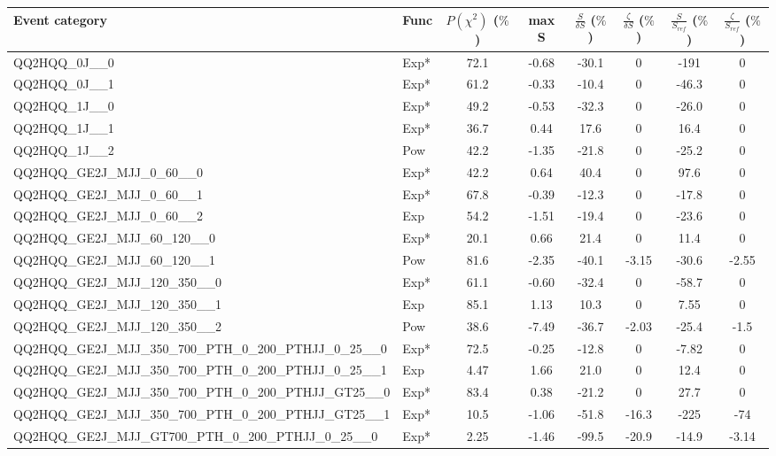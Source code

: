 \begin{table}[!h]
   \centering  \scriptsize
    \begin{tabular}{llcccccc}
    \hline
    \hline
   Event category               & Func &  $P(\chi^2)$ ($\%$) & max S  & $\frac{S}{\delta S}$ ($\%$)  &  $\frac{\zeta}{\delta S}$ ($\%$)   & $\frac{S}{S_{ref}}$ ($\%$) & $\frac{\zeta}{S_{ref}}$ ($\%$)  \\ \hline
    \hline
 QQ2HQQ\_0J\_\_0 & Exp* & 72.1 & -0.68 & -30.1 & 0 & -191 & 0 \\
 QQ2HQQ\_0J\_\_1 & Exp* & 61.2 & -0.33 & -10.4 & 0 & -46.3 & 0  \\
 QQ2HQQ\_1J\_\_0 & Exp* & 49.2 & -0.53 & -32.3 & 0 & -26.0 & 0 \\
 QQ2HQQ\_1J\_\_1 & Exp* & 36.7 & 0.44 & 17.6 & 0 & 16.4 & 0 \\
 QQ2HQQ\_1J\_\_2 & Pow & 42.2 & -1.35 & -21.8 & 0 & -25.2 & 0 \\
 QQ2HQQ\_GE2J\_MJJ\_0\_60\_\_0 & Exp* & 42.2 & 0.64 & 40.4 & 0 & 97.6 & 0 \\
 QQ2HQQ\_GE2J\_MJJ\_0\_60\_\_1 & Exp* & 67.8 & -0.39 & -12.3 & 0 & -17.8 & 0 \\
 QQ2HQQ\_GE2J\_MJJ\_0\_60\_\_2 & Exp & 54.2 & -1.51 & -19.4 & 0 & -23.6 & 0 \\
 QQ2HQQ\_GE2J\_MJJ\_60\_120\_\_0 & Exp* & 20.1 & 0.66 & 21.4 & 0 & 11.4 & 0 \\
 QQ2HQQ\_GE2J\_MJJ\_60\_120\_\_1 & Pow & 81.6 & -2.35 & -40.1 & -3.15 & -30.6 & -2.55 \\
 QQ2HQQ\_GE2J\_MJJ\_120\_350\_\_0 & Exp* & 61.1 & -0.60 & -32.4 & 0 & -58.7 & 0 \\
 QQ2HQQ\_GE2J\_MJJ\_120\_350\_\_1 & Exp & 85.1 & 1.13 & 10.3 & 0 & 7.55 & 0 \\
 QQ2HQQ\_GE2J\_MJJ\_120\_350\_\_2 & Pow & 38.6 & -7.49 & -36.7 & -2.03 & -25.4 & -1.5 \\
 QQ2HQQ\_GE2J\_MJJ\_350\_700\_PTH\_0\_200\_PTHJJ\_0\_25\_\_0 & Exp* & 72.5 & -0.25 & -12.8 & 0 & -7.82 & 0 \\
 QQ2HQQ\_GE2J\_MJJ\_350\_700\_PTH\_0\_200\_PTHJJ\_0\_25\_\_1 & Exp & 4.47 & 1.66 & 21.0 & 0 & 12.4 & 0 \\
 QQ2HQQ\_GE2J\_MJJ\_350\_700\_PTH\_0\_200\_PTHJJ\_GT25\_\_0 & Exp* & 83.4 & 0.38 & -21.2 & 0 & 27.7 & 0 \\
 QQ2HQQ\_GE2J\_MJJ\_350\_700\_PTH\_0\_200\_PTHJJ\_GT25\_\_1 & Exp* & 10.5 & -1.06 & -51.8 & -16.3 & -225 & -74 \\
 QQ2HQQ\_GE2J\_MJJ\_GT700\_PTH\_0\_200\_PTHJJ\_0\_25\_\_0 & Exp* & 2.25 & -1.46 & -99.5 & -20.9 & -14.9 & -3.14 \\

\end{tabular}
\end{table}
